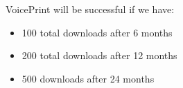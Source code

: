 VoicePrint will be successful if we have:
\begin{itemize}
    \item 100 total downloads after 6 months
    \item 200 total downloads after 12 months
    \item 500 downloads after 24 months
\end{itemize}